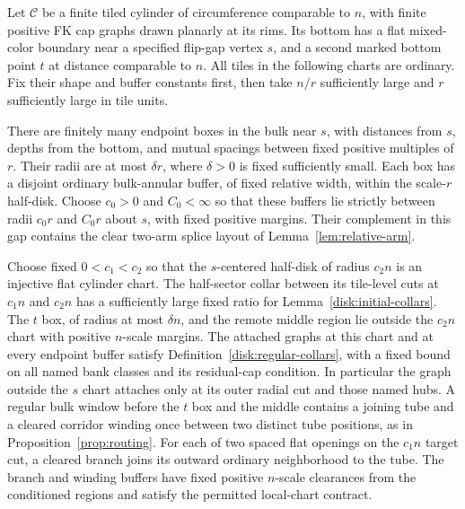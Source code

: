 \begin{corollary}
\label{disk:grouped-cylinder}
Let $\mathcal C$ be a finite tiled cylinder of circumference comparable
to $n$, with finite positive FK cap graphs drawn planarly at its rims.
Its bottom has a flat mixed-color boundary near a specified flip-gap
vertex $s$, and a second marked bottom point $t$ at distance comparable
to $n$. All tiles in the following charts are ordinary. Fix their shape
and buffer constants first, then take $n/r$ sufficiently large and
$r$ sufficiently large in tile units.

There are finitely many endpoint boxes in the bulk near $s$, with
distances from $s$, depths from the bottom, and mutual spacings between
fixed positive multiples of $r$. Their radii are at most $\delta r$,
where $\delta>0$ is fixed sufficiently small. Each box has a disjoint
ordinary bulk-annular buffer, of fixed relative width, within the
scale-$r$ half-disk. Choose $c_0>0$ and $C_0<\infty$ so that these
buffers lie strictly between radii $c_0r$ and $C_0r$ about $s$, with
fixed positive margins. Their complement in this gap contains the
clear two-arm splice layout of Lemma~\ref{lem:relative-arm}.

Choose fixed $0<c_1<c_2$ so that the $s$-centered half-disk of radius
$c_2n$ is an injective flat cylinder chart. The half-sector collar
between its tile-level cuts at $c_1n$ and $c_2n$ has a sufficiently
large fixed ratio for Lemma~\ref{disk:initial-collars}. The $t$ box,
of radius at most $\delta n$, and the remote middle region lie outside
the $c_2n$ chart with positive $n$-scale margins. The attached graphs
at this chart and at every endpoint buffer satisfy
Definition~\ref{disk:regular-collars}, with a fixed bound on all named
bank classes and its residual-cap condition. In particular the graph
outside the $s$ chart attaches only at its outer radial cut and those
named hubs. A regular bulk window before the $t$ box and the middle
contains a joining tube and a cleared corridor winding once between
two distinct tube positions, as in Proposition~\ref{prop:routing}.
For each of two spaced flat openings on the $c_1n$ target cut, a
cleared branch joins its outward ordinary neighborhood to the tube.
The branch and winding buffers have fixed positive $n$-scale
clearances from the conditioned regions and satisfy the permitted
local-chart contract.


\end{corollary}
